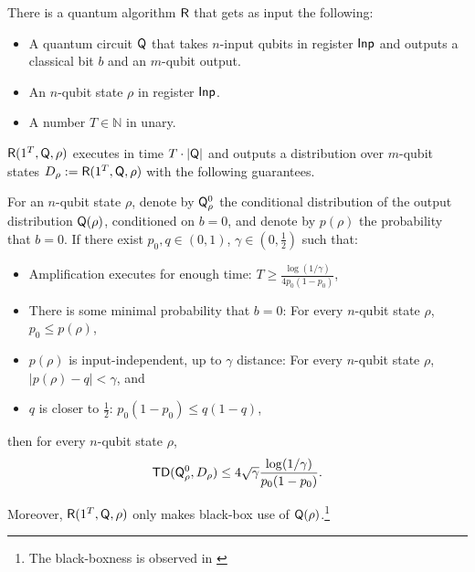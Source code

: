 \begin{lemma}\label{lem:Watrous}
There is a quantum algorithm $\mathsf{R}$ that gets as input the following:
\begin{itemize}
\item A quantum circuit $\mathsf{Q}$ that takes $n$-input qubits in register $\mathsf{Inp}$ and outputs a classical bit $b$ and an $m$-qubit output.  
\item An $n$-qubit state $\rho$ in register $\mathsf{Inp}$.
\item A number $T\in \mathbb{N}$ in unary.
\end{itemize}

$\mathsf{R}(1^T,\mathsf{Q},\rho)$ executes in time $T\cdot|\mathsf{Q}|$  and outputs a distribution over $m$-qubit states  $D_{\rho}:= \mathsf{R}(1^T,\mathsf{Q},\rho)$  with the following guarantees.

For an $n$-qubit state $\rho$, denote by $\mathsf{Q}_{\rho}^0$ the conditional distribution of the output distribution $\mathsf{Q}(\rho)$,
conditioned on $b = 0$, and denote by $p(\rho)$ the probability that $b = 0$. If there exist $p_0, q \in (0,1)$, $\gamma \in (0,\frac{1}{2})$
such that:
\begin{itemize}
    \item  Amplification executes for enough time: $T\geq \frac{\log (1/\gamma)}{4p_0(1-p_0)}$,
    \item  There is some minimal probability that $b = 0$: For every $n$-qubit state $\rho$, $p_0\leq p(\rho)$,
    \item  $p(\rho)$ is input-independent, up to $\gamma$ distance: For every $n$-qubit state $\rho$, $|p(\rho)-q|<\gamma$, and
    \item  $q$ is closer to $\frac{1}{2}$: $p_0(1-p_0)\leq q(1-q)$,
\end{itemize}
then for every $n$-qubit state $\rho$,
\begin{align*}
    \mathsf{TD}(\mathsf{Q}_{\rho}^0,D_{\rho})\leq 4\sqrt{\gamma}\frac{\log(1/\gamma)}{p_0(1-p_0)}.
\end{align*}

Moreover, $\mathsf{R}(1^T,\mathsf{Q},\rho)$ only makes black-box use of $\mathsf{Q}(\rho)$.\footnote{The black-boxness is observed in \cite{C:ChiChuYam21,C:CCLY22}} 
\end{lemma} 
